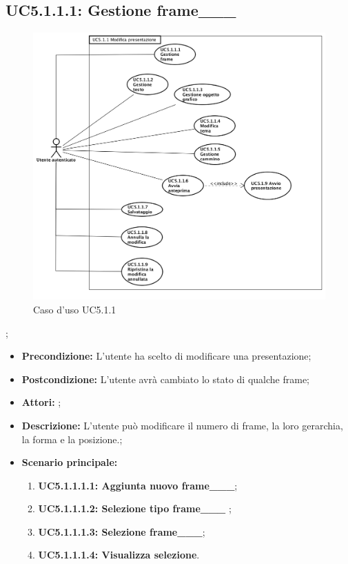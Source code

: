 \subsection{ UC5.1.1.1: Gestione frame___}

\begin{figure}[h]
	\begin{center}
	\includegraphics[scale=0.4]{diagram/UC5-1-1.png}
	\caption{Caso d'uso UC5.1.1}
	\end{center}
\end{figure};
\begin{itemize}
	\item \textbf{Precondizione:} L'utente ha scelto di modificare una presentazione;
	\item \textbf{Postcondizione:} L'utente avrà cambiato lo stato di qualche frame;
	\item \textbf{Attori:} ;
	\item \textbf{Descrizione:} L'utente può modificare il numero di frame, la loro gerarchia, la forma e la posizione.;
	\item \textbf{Scenario principale:}
	\begin{enumerate}
		\item \textbf{ UC5.1.1.1.1: Aggiunta nuovo frame___};
		\item \textbf{ UC5.1.1.1.2: Selezione tipo frame___ };
		\item \textbf{ UC5.1.1.1.3: Selezione frame___};
		\item \textbf{ UC5.1.1.1.4: Visualizza selezione}.
	\end{enumerate}
\end{itemize}

